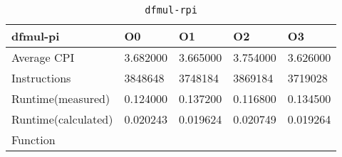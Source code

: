 \begin{table}[ht!]
\centering
\caption{\texttt{dfmul-rpi}}
\label{tab:dfmul-rpi}
\begin{tabular}{|l|l|l|l|l|}
\hline
\textbf{dfmul-pi}	&	\textbf{O0}	&	\textbf{O1}	&	\textbf{O2}	&	\textbf{O3}	\\\hline\hline
Average CPI	&	3.682000	&	3.665000	&	3.754000	&	3.626000	\\\hline
Instructions	&	3848648	&	3748184	&	3869184	&	3719028	\\\hline
Runtime(measured)	&	0.124000	&	0.137200	&	0.116800	&	0.134500	\\\hline
Runtime(calculated)	&	0.020243	&	0.019624	&	0.020749	&	0.019264	\\\hline
Function	&		&		&		&		\\\hline
\end{tabular}
\end{table}
